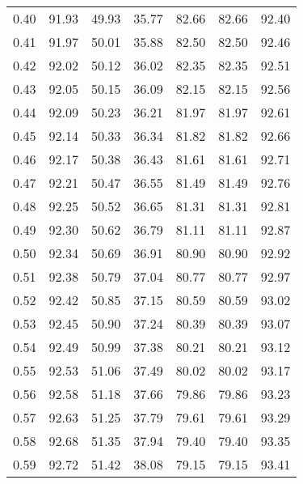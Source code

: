 \begin{tabular}{|c|c|c|c|c|c|c|}
      0.40 &     91.93 &     49.93 &      35.77 &   82.66 &      82.66 &         92.40 \\
      0.41 &     91.97 &     50.01 &      35.88 &   82.50 &      82.50 &         92.46 \\
      0.42 &     92.02 &     50.12 &      36.02 &   82.35 &      82.35 &         92.51 \\
      0.43 &     92.05 &     50.15 &      36.09 &   82.15 &      82.15 &         92.56 \\
      0.44 &     92.09 &     50.23 &      36.21 &   81.97 &      81.97 &         92.61 \\
      0.45 &     92.14 &     50.33 &      36.34 &   81.82 &      81.82 &         92.66 \\
      0.46 &     92.17 &     50.38 &      36.43 &   81.61 &      81.61 &         92.71 \\
      0.47 &     92.21 &     50.47 &      36.55 &   81.49 &      81.49 &         92.76 \\
      0.48 &     92.25 &     50.52 &      36.65 &   81.31 &      81.31 &         92.81 \\
      0.49 &     92.30 &     50.62 &      36.79 &   81.11 &      81.11 &         92.87 \\
      0.50 &     92.34 &     50.69 &      36.91 &   80.90 &      80.90 &         92.92 \\
      0.51 &     92.38 &     50.79 &      37.04 &   80.77 &      80.77 &         92.97 \\
      0.52 &     92.42 &     50.85 &      37.15 &   80.59 &      80.59 &         93.02 \\
      0.53 &     92.45 &     50.90 &      37.24 &   80.39 &      80.39 &         93.07 \\
      0.54 &     92.49 &     50.99 &      37.38 &   80.21 &      80.21 &         93.12 \\
      0.55 &     92.53 &     51.06 &      37.49 &   80.02 &      80.02 &         93.17 \\
      0.56 &     92.58 &     51.18 &      37.66 &   79.86 &      79.86 &         93.23 \\
      0.57 &     92.63 &     51.25 &      37.79 &   79.61 &      79.61 &         93.29 \\
      0.58 &     92.68 &     51.35 &      37.94 &   79.40 &      79.40 &         93.35 \\
      0.59 &     92.72 &     51.42 &      38.08 &   79.15 &      79.15 &         93.41 \\

\end{tabular}
